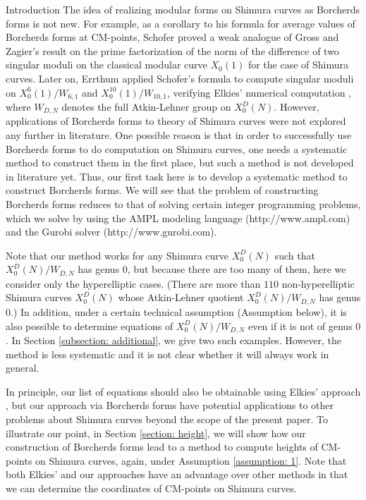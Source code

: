 \documentclass{amsart}
\theoremstyle{definition}
\begin{document}
\begin{section}{Introduction}
The idea of realizing modular forms on Shimura curves as Borcherds 
forms is not new. For example, as a corollary to his formula for
average values of Borcherds forms at CM-points, Schofer \cite{Schofer}
proved a weak analogue of Gross and Zagier's result
\cite{Gross-Zagier} on the prime factorization of the norm of the
difference of two singular moduli on the classical modular curve
$X_0(1)$ for the case of Shimura curves. Later on, Errthum
\cite{Errthum} applied Schofer’s formula to
compute singular moduli on $X^6_0(1)/W_{6,1}$ and
$X^{10}_0(1)/W_{10,1}$, verifying Elkies’ numerical computation
\cite{Elkies-computation}, where $W_{D,N}$ denotes the full
Atkin-Lehner group on $X_0^D(N)$. However, applications of
Borcherds forms to theory of Shimura curves were not explored any
further in literature. One possible reason is that in order to
successfully use Borcherds forms to do computation on Shimura curves,
one needs a systematic method to construct them in the first place,
but such a method is not developed in literature yet. Thus, our first
task here is to develop a systematic method to construct Borcherds
forms. We will see that the problem of constructing Borcherds forms
reduces to that of solving certain integer programming problems,
which we solve by using the AMPL modeling language
(http://www.ampl.com) and the Gurobi solver (http://www.gurobi.com).

Note that our method works for any Shimura curve $X_0^D(N)$ such that
$X_0^D(N)/W_{D,N}$ has genus $0$, but because there are too many of
them, here we consider only the hyperelliptic cases. (There are more
than $110$ non-hyperelliptic Shimura curves $X_0^D(N)$ whose
Atkin-Lehner quotient $X_0^D(N)/W_{D,N}$ has genus $0$.) In addition,
under a certain technical assumption (Assumption below), it is also possible to determine
equations of $X_0^D(N)/W_{D,N}$ even if it is not of genus $0$. In
Section \ref{subsection: additional}, we give two such
examples. However, the method is less systematic and it is not clear
whether it will always work in general.

In principle, our list of equations should also be
obtainable using Elkies' approach \cite{Elkies-K3}, but our approach
via Borcherds forms have potential applications to other problems
about Shimura curves beyond the scope of the present paper. To
illustrate our point, in Section \ref{section: height}, we will show
how our construction of Borcherds forms lead to a method to compute
heights of CM-points on Shimura curves, again, under Assumption
\ref{assumption: 1}. Note that both Elkies' and our approaches have an
advantage over other methods in that we can determine the coordinates
of CM-points on Shimura curves.


\end{section}
\end{document}
